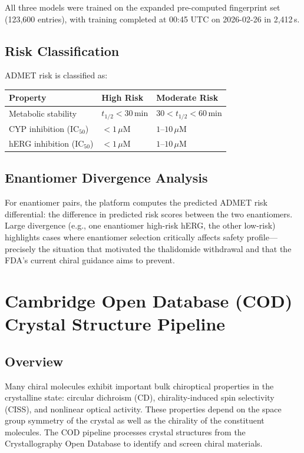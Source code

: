 \documentclass[11pt,a4paper]{article}
\begin{document}
All three models were trained on the expanded pre-computed fingerprint set
(123,600 entries), with training completed at 00:45 UTC on 2026-02-26 in 2,412\,s.

\subsection{Risk Classification}

ADMET risk is classified as:

\begin{center}
\begin{tabular}{lll}
\toprule
\textbf{Property} & \textbf{High Risk} & \textbf{Moderate Risk} \\
\midrule
Metabolic stability & $t_{1/2} < 30$\,min & $30 < t_{1/2} < 60$\,min \\
CYP inhibition (IC$_{50}$) & $< 1\,\mu$M & $1$--$10\,\mu$M \\
hERG inhibition (IC$_{50}$) & $< 1\,\mu$M & $1$--$10\,\mu$M \\
\bottomrule
\end{tabular}
\end{center}

\subsection{Enantiomer Divergence Analysis}

For enantiomer pairs, the platform computes the predicted ADMET risk differential:
the difference in predicted risk scores between the two enantiomers. Large
divergence (e.g., one enantiomer high-risk hERG, the other low-risk) highlights
cases where enantiomer selection critically affects safety profile---precisely
the situation that motivated the thalidomide withdrawal and that the FDA's
current chiral guidance aims to prevent.

\newpage

\section{Cambridge Open Database (COD) Crystal Structure Pipeline}
\label{sec:cod}

\subsection{Overview}

Many chiral molecules exhibit important bulk chiroptical properties in the
crystalline state: circular dichroism (CD), chirality-induced spin selectivity
(CISS), and nonlinear optical activity. These properties depend on the space
group symmetry of the crystal as well as the chirality of the constituent
molecules. The COD pipeline processes crystal structures from the Crystallography
Open Database to identify and screen chiral materials.
\end{document}
